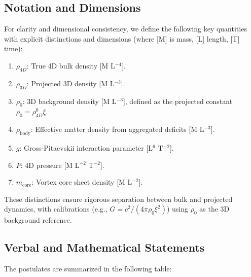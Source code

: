 \documentclass{article}
\begin{document}
\subsection{Notation and Dimensions}

For clarity and dimensional consistency, we define the following key quantities with explicit distinctions and dimensions (where [M] is mass, [L] length, [T] time):

\begin{enumerate}
\item $\rho_{4D}$: True 4D bulk density [M L$^{-4}$].
\item $\rho_{3D}$: Projected 3D density [M L$^{-3}$].
\item $\rho_0$: 3D background density [M L$^{-3}$], defined as the projected constant $\rho_0 = \rho_{4D}^0 \xi$.
\item $\rho_{\text{body}}$: Effective matter density from aggregated deficits [M L$^{-3}$].
\item $g$: Gross-Pitaevskii interaction parameter [L$^6$ T$^{-2}$].
\item $P$: 4D pressure [M L$^{-2}$ T$^{-2}$].
\item $m_{\text{core}}$: Vortex core sheet density [M L$^{-2}$].
\end{enumerate}

These distinctions ensure rigorous separation between bulk and projected dynamics, with calibrations (e.g., $G = c^2 / (4\pi \rho_0 \xi^2)$) using $\rho_0$ as the 3D background reference.

\subsection{Verbal and Mathematical Statements}

The postulates are summarized in the following table:
\end{document}
